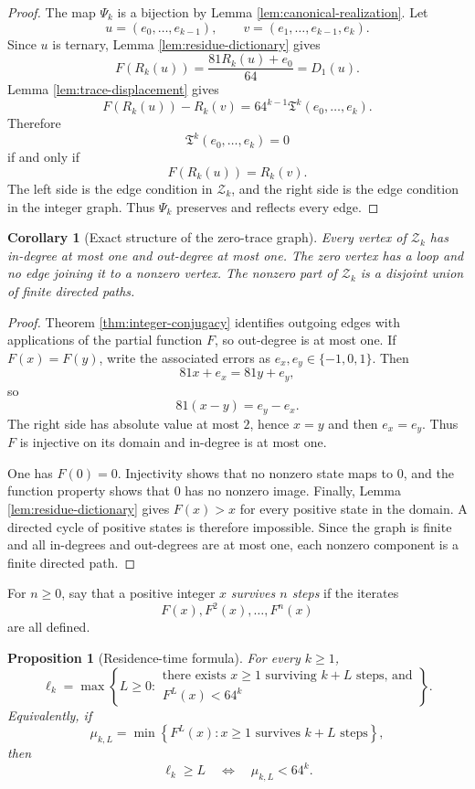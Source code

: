\documentclass[11pt]{article}
\newtheorem{proposition}[theorem]{Proposition}
\newtheorem{corollary}[theorem]{Corollary}
\theoremstyle{definition}
\theoremstyle{remark}
\newcommand{\Tq}{\mathfrak{T}}
\begin{document}
\begin{proof}
The map $\Psi_k$ is a bijection by Lemma \ref{lem:canonical-realization}. Let
\[
u=(e_0,\ldots,e_{k-1}),
\qquad
v=(e_1,\ldots,e_{k-1},e_k).
\]
Since $u$ is ternary, Lemma \ref{lem:residue-dictionary} gives
\[
F(R_k(u))=\frac{81R_k(u)+e_0}{64}=D_1(u).
\]
Lemma \ref{lem:trace-displacement} gives
\[
F(R_k(u))-R_k(v)
=64^{k-1}\Tq^k(e_0,\ldots,e_k).
\]
Therefore
\[
\Tq^k(e_0,\ldots,e_k)=0
\]
if and only if
\[
F(R_k(u))=R_k(v).
\]
The left side is the edge condition in $\mathcal Z_k$, and the right side is the edge condition in the integer graph. Thus $\Psi_k$ preserves and reflects every edge.
\end{proof}

\begin{corollary}[Exact structure of the zero-trace graph]
\label{cor:graph-structure}
Every vertex of $\mathcal Z_k$ has in-degree at most one and out-degree at most one. The zero vertex has a loop and no edge joining it to a nonzero vertex. The nonzero part of $\mathcal Z_k$ is a disjoint union of finite directed paths.
\end{corollary}

\begin{proof}
Theorem \ref{thm:integer-conjugacy} identifies outgoing edges with applications of the partial function $F$, so out-degree is at most one. If $F(x)=F(y)$, write the associated errors as $e_x,e_y\in\{-1,0,1\}$. Then
\[
81x+e_x=81y+e_y,
\]
so
\[
81(x-y)=e_y-e_x.
\]
The right side has absolute value at most $2$, hence $x=y$ and then $e_x=e_y$. Thus $F$ is injective on its domain and in-degree is at most one.

One has $F(0)=0$. Injectivity shows that no nonzero state maps to $0$, and the function property shows that $0$ has no nonzero image. Finally, Lemma \ref{lem:residue-dictionary} gives $F(x)>x$ for every positive state in the domain. A directed cycle of positive states is therefore impossible. Since the graph is finite and all in-degrees and out-degrees are at most one, each nonzero component is a finite directed path.
\end{proof}

For $n\ge0$, say that a positive integer $x$ \emph{survives $n$ steps} if the iterates
\[
F(x),F^2(x),\ldots,F^n(x)
\]
are all defined.

\begin{proposition}[Residence-time formula]
\label{prop:residence}
For every $k\ge1$,
\[
\ell_k
=
\max\left\{
L\ge0:
\begin{array}{l}
\text{there exists $x\ge1$ surviving $k+L$ steps, and}\\
F^L(x)<64^k
\end{array}
\right\}.
\]
Equivalently, if
\[
\mu_{k,L}
=
\min\left\{
F^L(x):x\ge1\text{ survives $k+L$ steps}
\right\},
\]
then
\[
\ell_k\ge L
\quad\Longleftrightarrow\quad
\mu_{k,L}<64^k.
\]
\end{proposition}
\end{document}

